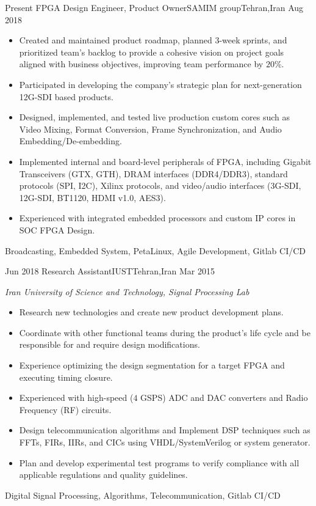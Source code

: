
\begin{experiences}
  \experience
  {Present} {FPGA Design Engineer, Product Owner}{SAMIM group}{Tehran,Iran}
  {Aug 2018} {
    \begin{itemize}

      \item Created and maintained product roadmap, planned 3-week sprints,
            and prioritized team's backlog to provide a cohesive vision on
            project goals aligned with business objectives, improving team
            performance by $20\%$.
      \item Participated in developing the company's strategic plan for
            next-generation 12G-SDI based products.
      \item Designed, implemented, and tested live production custom cores
            such as Video Mixing, Format Conversion, Frame Synchronization,
            and Audio Embedding/De-embedding.
      \item Implemented internal and board-level peripherals of FPGA, including
            Gigabit Transceivers (GTX, GTH), DRAM interfaces (DDR4/DDR3),
            standard protocols (SPI, I2C), Xilinx protocols, and video/audio
            interfaces (3G-SDI, 12G-SDI, BT1120, HDMI v1.0, AES3).
      \item Experienced with integrated embedded processors and custom IP cores
            in SOC FPGA Design.
    \end{itemize}
  }
  {Broadcasting, Embedded System, PetaLinux, Agile Development, Gitlab CI/CD}

  \emptySeparator

  \experience
  {Jun 2018} {Research Assistant}{IUST}{Tehran,Iran}
  {Mar 2015} {
    \emph{Iran University of Science and Technology, Signal Processing Lab}
    \begin{itemize}
      \item Research new technologies and create new product development plans.
      \item Coordinate with other functional teams during the product's life
            cycle and be responsible for and require design modifications.
      \item Experience optimizing the design segmentation for a target FPGA
            and executing timing closure.
      \item Experienced with high-speed ($4$ GSPS) ADC and DAC converters
            and Radio Frequency (RF) circuits.
      \item Design telecommunication algorithms and Implement DSP techniques
            such as FFTs, FIRs, IIRs, and CICs using VHDL/SystemVerilog
            or system generator.
      \item Plan and develop experimental test programs to verify compliance
            with all applicable regulations and quality guidelines.
    \end{itemize}
  }
  {Digital Signal Processing, Algorithms, Telecommunication, Gitlab CI/CD}


\end{experiences}

